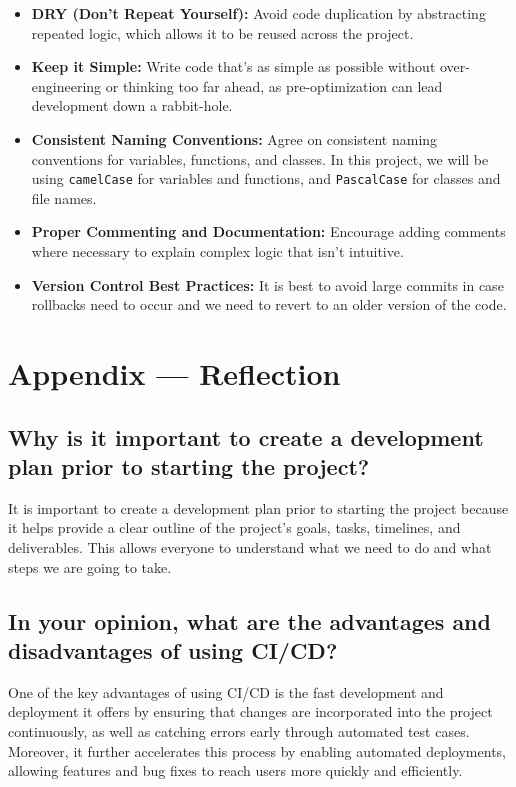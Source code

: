 \documentclass{article}
\begin{document}
\begin{itemize}
    \item \textbf{DRY (Don't Repeat Yourself):} Avoid code duplication by abstracting repeated logic, which allows it to be reused across the project.
    \item \textbf{Keep it Simple:} Write code that's as simple as possible without over-engineering or thinking too far ahead, as pre-optimization can lead development down a rabbit-hole.
    \item \textbf{Consistent Naming Conventions:} Agree on consistent naming conventions for variables, functions, and classes. In this project, we will be using \texttt{camelCase} for variables and functions, and \texttt{PascalCase} for classes and file names.
    \item \textbf{Proper Commenting and Documentation:} Encourage adding comments where necessary to explain complex logic that isn’t intuitive.
    \item \textbf{Version Control Best Practices:} It is best to avoid large commits in case rollbacks need to occur and we need to revert to an older version of the code.
\end{itemize}

\newpage{}

\section*{Appendix --- Reflection}




\subsection*{Why is it important to create a development plan prior to starting the project?}
It is important to create a development plan prior to starting the project because it helps provide a clear outline of the project's goals, tasks, timelines, and deliverables. This allows everyone to understand what we need to do and what steps we are going to take.

\subsection*{In your opinion, what are the advantages and disadvantages of using CI/CD?}
One of the key advantages of using CI/CD is the fast development and deployment it offers by ensuring that changes are incorporated into the project continuously, as well as catching errors early through automated test cases. Moreover, it further accelerates this process by enabling automated deployments, allowing features and bug fixes to reach users more quickly and efficiently.
\end{document}

